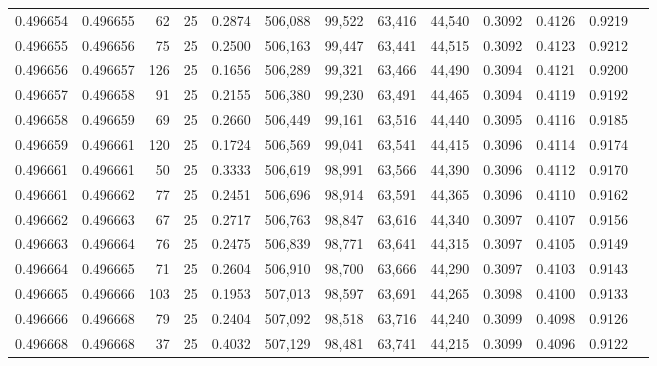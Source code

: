 \begin{tabular}{rrrrrrrrrrrrr}
0.496654 & 0.496655 &    62 &  25 &                                     0.2874 & 506,088 &  99,522 &  63,416 &  44,540 & 0.3092 & 0.4126 & 0.9219 \\
0.496655 & 0.496656 &    75 &  25 &                                     0.2500 & 506,163 &  99,447 &  63,441 &  44,515 & 0.3092 & 0.4123 & 0.9212 \\
0.496656 & 0.496657 &   126 &  25 &                                     0.1656 & 506,289 &  99,321 &  63,466 &  44,490 & 0.3094 & 0.4121 & 0.9200 \\
0.496657 & 0.496658 &    91 &  25 &                                     0.2155 & 506,380 &  99,230 &  63,491 &  44,465 & 0.3094 & 0.4119 & 0.9192 \\
0.496658 & 0.496659 &    69 &  25 &                                     0.2660 & 506,449 &  99,161 &  63,516 &  44,440 & 0.3095 & 0.4116 & 0.9185 \\
0.496659 & 0.496661 &   120 &  25 &                                     0.1724 & 506,569 &  99,041 &  63,541 &  44,415 & 0.3096 & 0.4114 & 0.9174 \\
0.496661 & 0.496661 &    50 &  25 &                                     0.3333 & 506,619 &  98,991 &  63,566 &  44,390 & 0.3096 & 0.4112 & 0.9170 \\
0.496661 & 0.496662 &    77 &  25 &                                     0.2451 & 506,696 &  98,914 &  63,591 &  44,365 & 0.3096 & 0.4110 & 0.9162 \\
0.496662 & 0.496663 &    67 &  25 &                                     0.2717 & 506,763 &  98,847 &  63,616 &  44,340 & 0.3097 & 0.4107 & 0.9156 \\
0.496663 & 0.496664 &    76 &  25 &                                     0.2475 & 506,839 &  98,771 &  63,641 &  44,315 & 0.3097 & 0.4105 & 0.9149 \\
0.496664 & 0.496665 &    71 &  25 &                                     0.2604 & 506,910 &  98,700 &  63,666 &  44,290 & 0.3097 & 0.4103 & 0.9143 \\
0.496665 & 0.496666 &   103 &  25 &                                     0.1953 & 507,013 &  98,597 &  63,691 &  44,265 & 0.3098 & 0.4100 & 0.9133 \\
0.496666 & 0.496668 &    79 &  25 &                                     0.2404 & 507,092 &  98,518 &  63,716 &  44,240 & 0.3099 & 0.4098 & 0.9126 \\
0.496668 & 0.496668 &    37 &  25 &                                     0.4032 & 507,129 &  98,481 &  63,741 &  44,215 & 0.3099 & 0.4096 & 0.9122 \\

\end{tabular}
